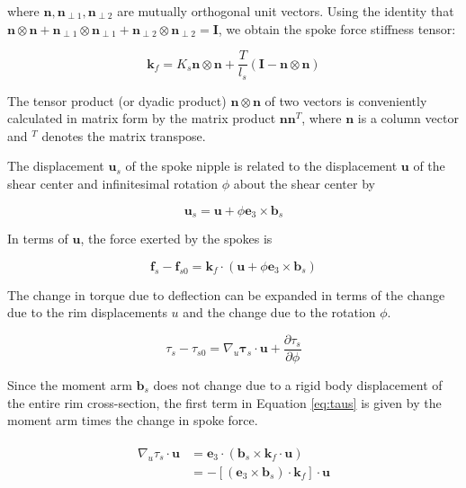 \documentclass[../thesis.tex]{subfiles}
\newcommand{\eh}{\mathbf{e}_3}
\newcommand{\n}{\mathbf{n}}
\newcommand{\npo}{\mathbf{n}_{\perp 1}}
\newcommand{\npt}{\mathbf{n}_{\perp 2}}
\newcommand{\bs}{\mathbf{b}_s}
\begin{document}
where $\n,\npo,\npt$ are mutually orthogonal unit vectors. Using the identity that $\n\otimes\n + \npo\otimes\npo + \npt\otimes\npt = \mathbf{I}$, we obtain the spoke force stiffness tensor:

\begin{equation}
\label{eq:kf}
\mathbf{k}_f = K_s \n\otimes\n + \frac{T}{l_s}(\mathbf{I} - \n\otimes\n)
\end{equation}

The tensor product (or dyadic product) $\n\otimes\n$ of two vectors is conveniently calculated in matrix form by the matrix product $\n\n^T$, where $\n$ is a column vector  and $^T$ denotes the matrix transpose.

The displacement $\mathbf{u}_s$ of the spoke nipple is related to the displacement $\mathbf{u}$ of the shear center and infinitesimal rotation $\phi$ about the shear center by

\begin{equation}
\label{eq:u_s}
\mathbf{u}_s = \mathbf{u} + \phi\eh \times \bs
\end{equation}

In terms of $\mathbf{u}$, the force exerted by the spokes is

\begin{equation}
\label{eq:fs_u}
\mathbf{f}_s - \mathbf{f}_{s0} = \mathbf{k}_f \cdot (\mathbf{u} + \phi\eh\times\bs)
\end{equation}

The change in torque due to deflection can be expanded in terms of the change due to the rim displacements $u$ and the change due to the rotation $\phi$.

\begin{equation}
\label{eq:taus}
\tau_s - \tau_{s0} = \nabla_u\mathbf{\tau}_s\cdot\mathbf{u} +
    \frac{\partial\tau_s}{\partial\phi}
\end{equation}

Since the moment arm $\bs$ does not change due to a rigid body displacement of the entire rim cross-section, the first term in Equation \eqref{eq:taus} is given by the moment arm times the change in spoke force.

\begin{align}
\label{eq:taus_del}
\begin{split}
\nabla_u\tau_s\cdot\mathbf{u} &= \eh\cdot (\bs\times\mathbf{k}_f\cdot\mathbf{u})\\
    &= -[(\eh\times\bs)\cdot\mathbf{k}_f]\cdot\mathbf{u}
\end{split}
\end{align}
\end{document}
